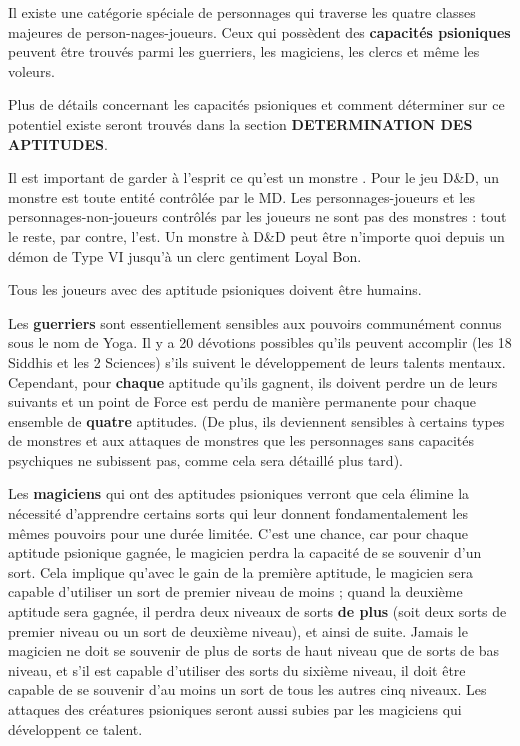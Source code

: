 \documentclass[11pt]{article}
\begin{document}
{\parindent0pt

Il existe une catégorie spéciale de personnages qui traverse les quatre classes majeures de person-nages-joueurs. Ceux qui possèdent des \textbf{capacités psioniques} peuvent être trouvés parmi les guerriers, les magiciens, les clercs et même les voleurs.

\bigskip

Plus de détails concernant les capacités psioniques et comment déterminer sur ce potentiel existe seront trouvés dans la section \textbf{DETERMINATION DES APTITUDES}.

\bigskip

Il est important de garder à l'esprit ce qu'est un \og monstre \fg{}. Pour le jeu D\&D, un monstre est toute entité contrôlée par le MD. Les personnages-joueurs et les personnages-non-joueurs contrôlés par les joueurs ne sont pas des monstres : tout le reste, par contre, l'est. Un monstre à D\&D peut être n'importe quoi depuis un démon de Type VI jusqu'à un clerc gentiment Loyal Bon.

\bigskip

Tous les joueurs avec des aptitude psioniques doivent être humains.

\bigskip

Les \textbf{guerriers} sont essentiellement sensibles aux pouvoirs communément connus sous le nom de Yoga. Il y a 20 \og dévotions \fg{} possibles qu'ils peuvent accomplir (les 18 Siddhis et les 2 Sciences) s'ils suivent le développement de leurs talents mentaux. Cependant, pour \textbf{chaque} aptitude qu'ils gagnent, ils doivent perdre un de leurs suivants et un point de Force est perdu de manière permanente pour chaque ensemble de \textbf{quatre} aptitudes. (De plus, ils deviennent sensibles à certains types de monstres et aux attaques de monstres que les personnages sans capacités psychiques ne subissent pas, comme cela sera détaillé plus tard).

\bigskip

Les \textbf{magiciens} qui ont des aptitudes psioniques verront que cela élimine la nécessité d'apprendre certains sorts qui leur donnent fondamentalement les mêmes pouvoirs pour une durée limitée. C'est une chance, car pour chaque aptitude psionique gagnée, le magicien perdra la capacité de se souvenir d'un sort. Cela implique qu'avec le gain de la première aptitude, le magicien sera capable d'utiliser un sort de premier niveau de moins ; quand la deuxième aptitude sera gagnée, il perdra deux niveaux de sorts \textbf{de plus} (soit deux sorts de premier niveau ou un sort de deuxième niveau), et ainsi de suite. Jamais le magicien ne doit se souvenir de plus de sorts de haut niveau que de sorts de bas niveau, et s'il est capable d'utiliser des sorts du sixième niveau, il doit être capable de se souvenir d'au moins un sort de tous les autres cinq niveaux. Les attaques des créatures psioniques seront aussi subies par les magiciens qui développent ce talent.

}
\end{document}
